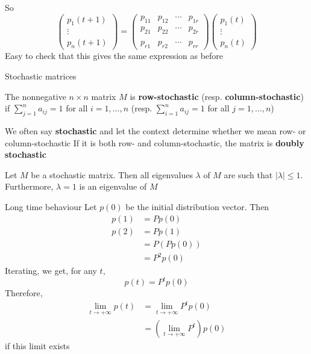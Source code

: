 \documentclass[aspectratio=169]{beamer}
\begin{document}
\begin{frame}
So
\[
\begin{pmatrix}
	p_1(t+1)\\ \vdots\\ p_n(t+1)
\end{pmatrix}
=
\begin{pmatrix}
p_{11} & p_{12} & \cdots & p_{1r} \\
p_{21} & p_{22} & \cdots & p_{2r} \\
&&& \\
p_{r1} & p_{r2} & \cdots & p_{rr}
\end{pmatrix}
\begin{pmatrix}
	p_1(t)\\ \vdots\\ p_n(t)
\end{pmatrix}
\]
\vfill
Easy to check that this gives the same expression as before
\end{frame}



\begin{frame}{Stochastic matrices}
\begin{definition}
The nonnegative $n\times n$ matrix $M$ is \textbf{row-stochastic} (resp. \textbf{column-stochastic}) if $\sum_{j=1}^na_{ij}=1$ for all $i=1,\dots,n$ (resp. $\sum_{i=1}^na_{ij}=1$ for all $j=1,\dots,n$)
\end{definition}
\vfill
We often say \textbf{stochastic} and let the context determine whether we mean row- or column-stochastic
\vfill
If it is both row- and column-stochastic, the matrix is \textbf{doubly stochastic}
\vfill
\begin{theorem}\label{th:spectrum_stochastic_matrix}
Let $M$ be a stochastic matrix. Then all eigenvalues $\lambda$ of $M$ are such that $|\lambda|\leq 1$. 
Furthermore, $\lambda =1$ is an eigenvalue of $M$
\end{theorem}
\end{frame}

\begin{frame}{Long time behaviour}
Let $p(0)$ be the initial distribution vector. Then
\begin{align*}
p(1) &= Pp(0) \\
p(2) &= Pp(1)\\
&= P(Pp(0)) \\
&= P^2p(0)
\end{align*}
\vfill
Iterating, we get, for any $t$,
\[
p(t)=P^tp(0)
\]
\vfill
Therefore, 
\begin{align*}
\lim_{t\rightarrow +\infty}p(t) &=
\lim_{t\rightarrow +\infty}P^tp(0) \\
&=\left(\lim_{t\rightarrow +\infty}P^t\right)p(0)
\end{align*}
if this limit exists
\end{frame}
\end{document}
